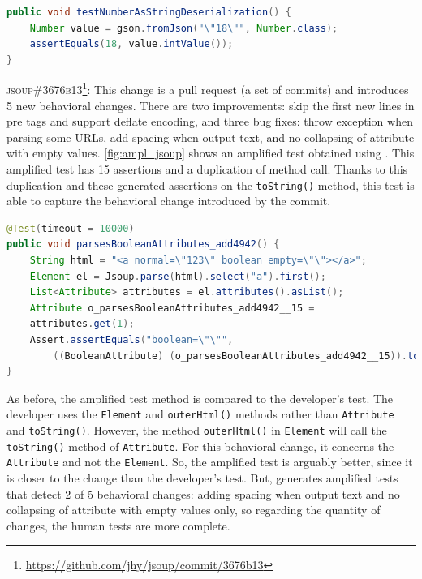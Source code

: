 \begin{lstlisting}[float,language=java,caption=Provided test by the developer for \textsc{44cad04} of Gson.,label=fig:diff_gson]
public void testNumberAsStringDeserialization() {
	Number value = gson.fromJson("\"18\"", Number.class);
	assertEquals(18, value.intValue());
}
\end{lstlisting}

\textsc{jsoup\#3676b13}\footnote{\url{https://github.com/jhy/jsoup/commit/3676b13}}: This change is a pull request (\ie a set of commits) and introduces 5 new behavioral changes.
There are two improvements: skip the first new lines in pre tags and support deflate encoding, and three bug fixes: throw exception when parsing some URLs, add spacing when output text, and no collapsing of attribute with empty values.
\autoref{fig:ampl_jsoup} shows an amplified test obtained using \DCII.
This amplified test has 15 assertions and a duplication of method call.
Thanks to this duplication and these generated assertions on the \texttt{toString()} method, this test is able to capture the behavioral change introduced by the commit.

\begin{lstlisting}[float,language=java,caption=Test generated by \DCII that detects the behavioral change of \textsc{3676b13} of Jsoup.,label=fig:ampl_jsoup]
@Test(timeout = 10000)
public void parsesBooleanAttributes_add4942() {
	String html = "<a normal=\"123\" boolean empty=\"\"></a>";
	Element el = Jsoup.parse(html).select("a").first();
	List<Attribute> attributes = el.attributes().asList();
	Attribute o_parsesBooleanAttributes_add4942__15 = 
	attributes.get(1);
	Assert.assertEquals("boolean=\"\"", 
		((BooleanAttribute) (o_parsesBooleanAttributes_add4942__15)).toString());
}
\end{lstlisting}

As before, the amplified test method is compared to the developer's test. 
The developer uses the \texttt{Element} and \texttt{outerHtml()} methods rather than \texttt{Attribute} and \texttt{toString()}.
However, the method \texttt{outerHtml()} in \texttt{Element} will call the \texttt{toString()} method of \texttt{Attribute}.
For this behavioral change, it concerns the \texttt{Attribute} and not the \texttt{Element}.
So, the amplified test is arguably better, since it is closer to the change than the developer's test.
But, \DCII generates amplified tests that detect 2 of 5 behavioral changes: adding spacing when output text and no collapsing of attribute with empty values only, so regarding the quantity of changes, the human tests are more complete.

